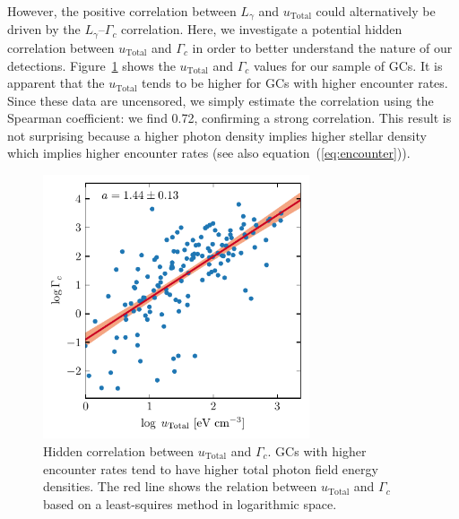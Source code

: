 \documentclass[doublespace,nopageskip]{VTthesis} %
\begin{document}
However, the positive correlation between $L_\gamma$ and $u_\mathrm{Total}$ could alternatively be driven by the $L_\gamma$--$\Gamma_c$ correlation. Here, we investigate a potential hidden correlation between $u_\mathrm{Total}$ and $\Gamma_c$ in order to better understand the nature of our detections. Figure~\ref{fig:hidden_0} shows the $u_\mathrm{Total}$ and $\Gamma_c$ values for our sample of GCs. It is apparent that the $u_\mathrm{Total}$ tends to be higher for GCs with higher encounter rates. Since these data are uncensored, we simply estimate the correlation using the Spearman coefficient: we find 0.72, confirming a strong correlation. This result is not surprising because a higher photon density implies higher stellar density which implies higher encounter rates (see also equation~(\ref{eq:encounter})).

\begin{figure}[htb]
    \centering
    \includegraphics[width=0.7\textwidth]{Figures/Globular/hidden.pdf}
    \caption{Hidden correlation between $u_\mathrm{Total}$ and $\Gamma_c$. GCs with higher encounter rates tend to have higher total photon field energy densities. The red line shows the relation between $u_\mathrm{Total}$ and $\Gamma_c$ based on a least-squires method in logarithmic space.}
    \label{fig:hidden_0}
\end{figure}
\end{document}
